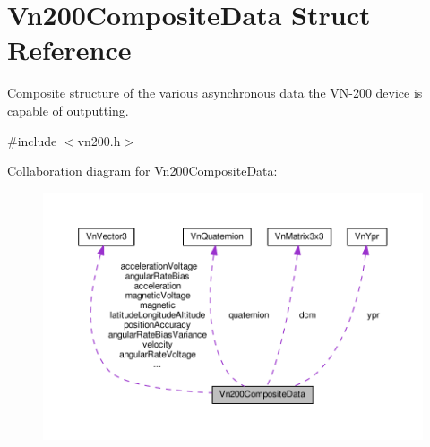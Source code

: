 \hypertarget{structVn200CompositeData}{}\section{Vn200\+Composite\+Data Struct Reference}
\label{structVn200CompositeData}


Composite structure of the various asynchronous data the V\+N-\/200 device is capable of outputting.  




{\ttfamily \#include $<$vn200.\+h$>$}



Collaboration diagram for Vn200\+Composite\+Data\+:
\nopagebreak
\begin{figure}[H]
\begin{center}
\leavevmode
\includegraphics[width=350pt]{structVn200CompositeData__coll__graph}
\end{center}
\end{figure}
